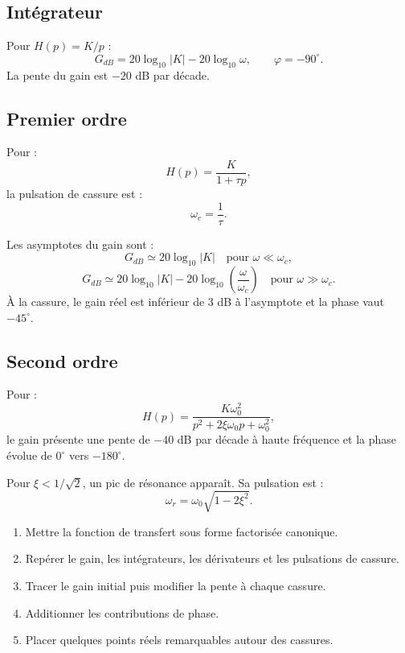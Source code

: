 \subsection{Intégrateur}

Pour $H(p)=K/p$ :
\[
G_{dB}=20\log_{10}|K|-20\log_{10}\omega,
\qquad
\varphi=-90^\circ.
\]
La pente du gain est $-20$ dB par décade.

\TLBodeIntegrateur[1]

\subsection{Premier ordre}

Pour :
\[
H(p)=\frac{K}{1+\tau p},
\]
la pulsation de cassure est :
\[
\omega_c=\frac1\tau.
\]

Les asymptotes du gain sont :
\[
G_{dB}\simeq20\log_{10}|K|\quad\text{pour }\omega\ll\omega_c,
\]
\[
G_{dB}\simeq20\log_{10}|K|-20\log_{10}\left(\frac{\omega}{\omega_c}\right)
\quad\text{pour }\omega\gg\omega_c.
\]
À la cassure, le gain réel est inférieur de 3 dB à l'asymptote et la phase vaut $-45^\circ$.

\TLBodePremierOrdre[1][1]

\subsection{Second ordre}

Pour :
\[
H(p)=\frac{K\omega_0^2}{p^2+2\xi\omega_0p+\omega_0^2},
\]
le gain présente une pente de $-40$ dB par décade à haute fréquence et la phase évolue de $0^\circ$ vers $-180^\circ$.

Pour $\xi<1/\sqrt2$, un pic de résonance apparaît. Sa pulsation est :
\[
\omega_r=\omega_0\sqrt{1-2\xi^2}.
\]

\TLBodeSecondOrdre[1][0.7][1]

\begin{SAmethode}[title={Tracer un diagramme de Bode asymptotique}]
\begin{enumerate}
  \item Mettre la fonction de transfert sous forme factorisée canonique.
  \item Repérer le gain, les intégrateurs, les dérivateurs et les pulsations de cassure.
  \item Tracer le gain initial puis modifier la pente à chaque cassure.
  \item Additionner les contributions de phase.
  \item Placer quelques points réels remarquables autour des cassures.
\end{enumerate}
\end{SAmethode}


